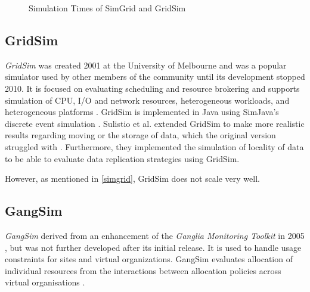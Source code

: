 \begin{figure}
\begin{center}
\caption{Simulation Times of SimGrid and GridSim \cite{simgrid_update}}
\label{diag}
\end{center}
\end{figure}

\subsection{GridSim}
\label{gridsim}

\textit{GridSim} was created 2001 at the University of Melbourne and was a popular simulator used by other members of the community until its development stopped 2010.
It is focused on evaluating scheduling and resource brokering and supports simulation of CPU, I/O and network resources, heterogeneous workloads, and heterogeneous platforms \cite{gridsim}. GridSim is implemented in Java using SimJava's discrete event simulation \cite{gridsim}.
Sulistio et al. \cite{sulistio2008toolkit} extended GridSim to make more realistic results regarding moving or the storage of data, which the original version struggled with \cite{1698650}. Furthermore, they implemented the simulation of locality of data to be able to evaluate data replication strategies using GridSim.

However, as mentioned in \cref{simgrid}, GridSim does not scale very well.

\subsection{GangSim}

\textit{GangSim} derived from an enhancement of the \textit{Ganglia Monitoring Toolkit} in 2005 \cite{dumitrescu2005gangsim}, but was not further developed after its initial release.
It is used to handle usage constraints for sites and virtual organizations. GangSim evaluates allocation of individual resources from the interactions between allocation policies across virtual organisations \cite{dumitrescu2005gangsim}.

